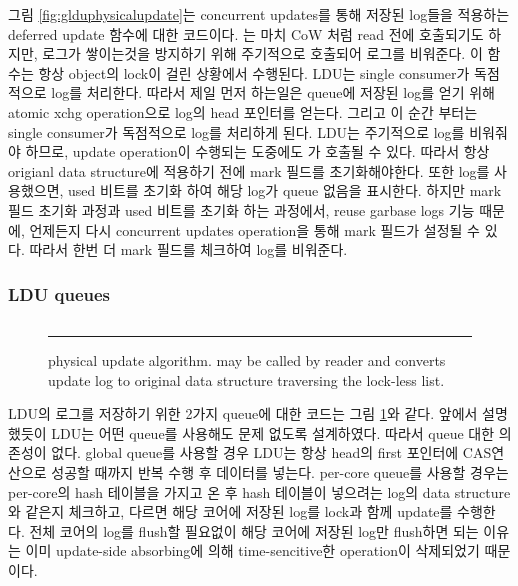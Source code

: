 \ifkor
그림 \ref{fig:glduphysicalupdate}는 concurrent updates를 통해 저장된 log들을 적용하는 deferred
update 함수에 대한 코드이다.
는 마치 CoW 처럼 read 전에 호출되기도 하지만, 로그가 쌓이는것을 방지하기 위해 주기적으로
호출되어 로그를 비워준다.
이 함수는 항상 object의 lock이 걸린 상황에서 수행된다. 
LDU는 single consumer가 독점적으로 log를 처리한다.
따라서 제일 먼저 하는일은 queue에 저장된 log를 얻기 위해 atomic xchg operation으로 log의 head 포인터를
얻는다.
그리고 이 순간 부터는 single consumer가 독점적으로 log를 처리하게 된다.
LDU는 주기적으로 log를 비워줘야 하므로, update operation이 수행되는 도중에도 가
호출될 수 있다.
따라서 항상 origianl data structure에 적용하기 전에 mark 필드를 초기화해야한다.
또한 log를 사용했으면, used 비트를 초기화 하여 해당 log가 queue 없음을 표시한다.
하지만 mark 필드 초기화 과정과 used 비트를 초기화 하는 과정에서, reuse garbase logs 기능 때문에,
언제든지 다시 concurrent updates operation을 통해 mark 필드가 설정될 수 있다.
따라서 한번 더 mark 필드를 체크하여 log를 비워준다.
\else



\fi

\ifkorthesis
\subsubsection{LDU queues}
\begin{figure}[tb!]
\inputminted[linenos,fontsize=\footnotesize, tabsize=2]{c}{src/ldu_queue.c}
\rule{\columnwidth}{0.5pt}
\vspace{-\baselineskip}
\caption{ physical update algorithm.  may be
 called by reader and converts update log to original data structure
 traversing the lock-less list.}
\label{fig:lduqueue}
\end{figure}

LDU의 로그를 저장하기 위한 2가지 queue에 대한 코드는 그림 \ref{fig:lduqueue}와 같다. 
앞에서 설명했듯이 LDU는 어떤 queue를 사용해도 문제 없도록 설계하였다.
따라서 queue 대한 의존성이 없다.
global queue를 사용할 경우 LDU는 항상 head의 first 포인터에 CAS연산으로 성공할 때까지 반복 수행 후 데이터를 넣는다. 
per-core queue를 사용할 경우는 per-core의 hash 테이블을 가지고 온 후 hash 테이블이 넣으려는 log의
data structure와 같은지 체크하고, 다르면 해당 코어에 저장된 log를 lock과 함께 update를 수행한다.
전체 코어의 log를 flush할 필요없이 해당 코어에 저장된 log만 flush하면 되는 이유는 이미 update-side
absorbing에 의해 time-sencitive한 operation이 삭제되었기 때문이다.
\fi



